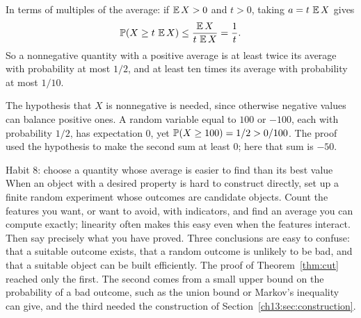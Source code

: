 In terms of multiples of the average: if $\operatorname{\mathbb E} X>0$ and $t>0$, taking $a=t\,\operatorname{\mathbb E} X$ gives
\[
\operatorname{\mathbb P}(X\ge t\,\operatorname{\mathbb E} X)\le\frac{\operatorname{\mathbb E} X}{t\,\operatorname{\mathbb E} X}=\frac1t.
\]
So a nonnegative quantity with a positive average is at least twice its average with probability at most $1/2$, and at least ten times its average with probability at most $1/10$.

The hypothesis that $X$ is nonnegative is needed, since otherwise negative values can balance positive ones. A random variable equal to $100$ or $-100$, each with probability $1/2$, has expectation $0$, yet $\operatorname{\mathbb P}(X\ge100)=1/2>0/100$. The proof used the hypothesis to make the second sum at least $0$; here that sum is $-50$.

\begin{principle}{Habit 8: choose a quantity whose average is easier to find than its best value}
When an object with a desired property is hard to construct directly, set up a finite random experiment whose outcomes are candidate objects. Count the features you want, or want to avoid, with indicators, and find an average you can compute exactly; linearity often makes this easy even when the features interact. Then say precisely what you have proved. Three conclusions are easy to confuse: that a suitable outcome exists, that a random outcome is unlikely to be bad, and that a suitable object can be built efficiently. The proof of Theorem~\ref{thm:cut} reached only the first. The second comes from a small upper bound on the probability of a bad outcome, such as the union bound or Markov's inequality can give, and the third needed the construction of Section~\ref{ch13:sec:construction}.
\end{principle}
